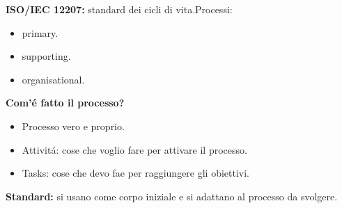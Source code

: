 \documentclass{article}
\begin{document}
\newpage
\textbf{ISO/IEC 12207: }standard dei cicli di vita.\newline Processi:
    \begin{itemize}
        \item primary.
        \item supporting.
        \item organisational.
    \end{itemize}
    
\bigbreak
\textbf{Com'\'e fatto il processo? }
    \begin{itemize}
        \item Processo vero e proprio.
        \item Attivit\'a: cose che voglio fare per attivare il processo.
        \item Tasks: cose che devo fae per raggiungere gli obiettivi.
    \end{itemize}
    
\bigbreak
\textbf{Standard: }si usano come corpo iniziale e si adattano al processo da svolgere.
\end{document}
